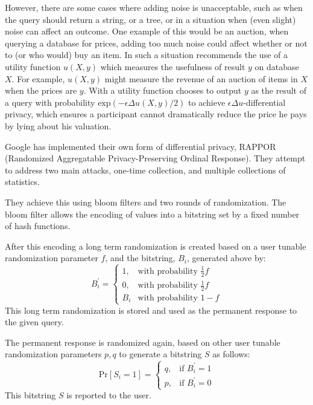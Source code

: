 However, there are some cases where adding noise is unacceptable, such as when
the query should return a string, or a tree, or in a situation when (even
slight) noise can affect an outcome. One example of this would be an auction,
when querying a database for prices, adding too much noise could affect whether
or not to (or who would) buy an item. In such a situation
\cite{mcsherry2007mechanism} recommends the use of a utility function $u(X,y)$
which measures the usefulness of result $y$ on database $X$. For example,
$u(X,y)$ might measure the revenue of an auction of items in $X$ when the prices
are $y$. With a utility function chooses to output $y$ as the result of a query
with probability $\text{exp}(-\epsilon \Delta u(X,y)/2)$ to achieve
$\epsilon\Delta u$-differential privacy, which ensures a participant cannot
dramatically reduce the price he pays by lying about his valuation.

Google has implemented their own form of differential privacy,
RAPPOR~\cite{erlingsson2014rappor} (Randomized Aggregatable Privacy-Preserving
Ordinal Response). They attempt to address two main attacks, one-time
collection, and multiple collections of statistics. 

They achieve this using bloom filters and two rounds of randomization. The bloom
filter allows the encoding of values into a bitstring set by a fixed number of
hash functions. 

After this encoding a long term randomization is created based
on a user tunable randomization parameter $f$, and the bitstring, $B_i$,
generated above by:
\[
    B^\prime_i = \begin{cases}
        1, & \mbox{with probability } \frac{1}{2} f\\
        0, & \mbox{with probability } \frac{1}{2} f\\
        B_i & \mbox{with probability } 1 - f
    \end{cases}
\]
This long term randomization is stored and used as the permanent response to the
given query.

The permanent response is randomized again, based on other user tunable
randomization parameters $p,q$ to generate a bitstring $S$ as follows:
\[
    \text{Pr}[S_i = 1] = \begin{cases}
        q, &\mbox{if } B^\prime_i = 1\\
        p, &\mbox{if } B^\prime_i = 0
    \end{cases}
\]
This bitstring $S$ is reported to the user.

